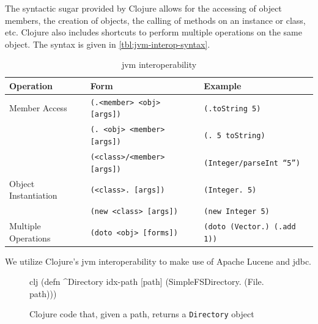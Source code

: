 			The syntactic sugar provided by Clojure allows for the accessing of object members, the creation of objects, the calling of methods on an instance or class, etc.  Clojure also includes shortcuts to perform multiple operations on the same object.  The syntax is given in \vref{tbl:jvm-interop-syntax}.
			
			\begin{table}
				\centering
				
				\begin{tabular}{lll}
					\toprule
					Operation & Form & Example \\
					\midrule
					Member Access & \texttt{(.<member> <obj> [args])} & \texttt{(.toString 5)} \\
					 & \texttt{(. <obj> <member> [args])} & \texttt{(. 5 toString)} \\
					 & \texttt{(<class>/<member> [args])} & \texttt{(Integer/parseInt ``5'')} \\
					Object Instantiation & \texttt{(<class>. [args])} & \texttt{(Integer. 5)} \\
					 & \texttt{(new <class> [args])} & \texttt{(new Integer 5)} \\
					Multiple Operations & \texttt{(doto <obj> [forms])} & \texttt{(doto (Vector.) (.add 1))} \\
					\bottomrule
				\end{tabular}
				
				\caption{\gls{jvm} interoperability}
				\label{tbl:jvm-interop-syntax}
			\end{table}
			
			We utilize Clojure's \gls{jvm} interoperability to make use of Apache Lucene and \gls{jdbc}.
			
			\begin{figure}
				\begin{singlespaced}
					\begin{pygments}{clj}
(defn ^Directory idx-path
  [path]
  (SimpleFSDirectory. (File. path)))
					\end{pygments}
				\end{singlespaced}
				
				\caption{Clojure code that, given a path, returns a \texttt{Directory} object}
			\end{figure}